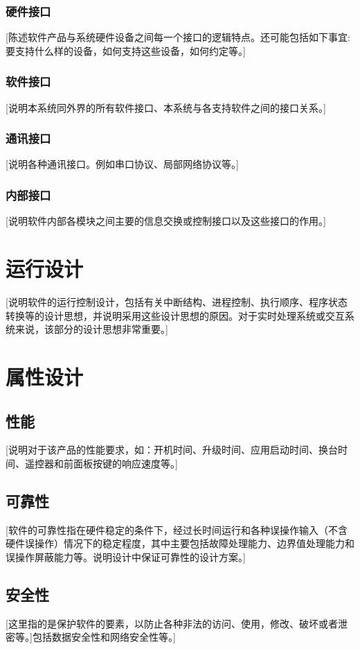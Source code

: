 \documentclass[10pt,a4paper,titlepage]{article} %
\begin{document}
\subsubsection{硬件接口}
[陈述软件产品与系统硬件设备之间每一个接口的逻辑特点。还可能包括如下事宜: 要支持什么样的设备，如何支持这些设备，如何约定等。]\newline
\subsubsection{软件接口}
[说明本系统同外界的所有软件接口、本系统与各支持软件之间的接口关系。]\newline
\subsubsection{通讯接口}
[说明各种通讯接口。例如串口协议、局部网络协议等。]\newline
\subsubsection{内部接口}
[说明软件内部各模块之间主要的信息交换或控制接口以及这些接口的作用。]\newline
\section{运行设计}
[说明软件的运行控制设计，包括有关中断结构、进程控制、执行顺序、程序状态转换等的设计思想，并说明采用这些设计思想的原因。对于实时处理系统或交互系统来说，该部分的设计思想非常重要。]\newline
\section{属性设计}
\subsection{性能}
[说明对于该产品的性能要求，如：开机时间、升级时间、应用启动时间、换台时间、遥控器和前面板按键的响应速度等。]\newline
\subsection{可靠性}
[软件的可靠性指在硬件稳定的条件下，经过长时间运行和各种误操作输入（不含硬件误操作）情况下的稳定程度，其中主要包括故障处理能力、边界值处理能力和误操作屏蔽能力等。说明设计中保证可靠性的设计方案。]\newline
\subsection{安全性}
[这里指的是保护软件的要素，以防止各种非法的访问、使用，修改、破坏或者泄密等。]包括数据安全性和网络安全性等。]\newline
\end{document}
